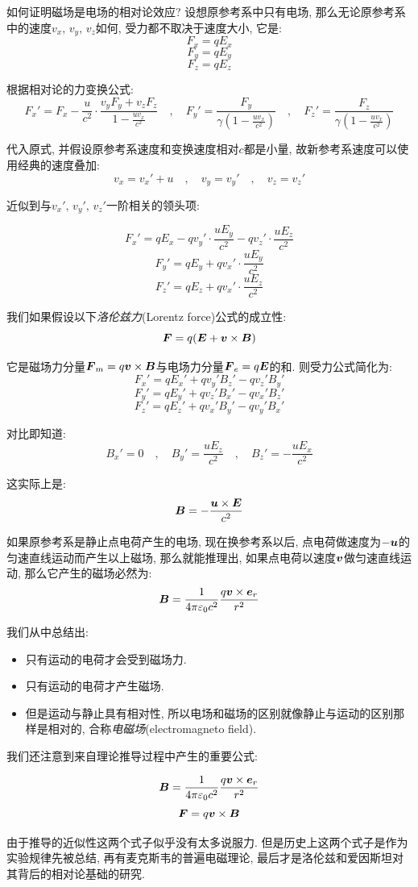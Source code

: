 如何证明磁场是电场的相对论效应? 设想原参考系中只有电场, 那么无论原参考系中的速度$v_x,\,v_y,\,v_z$如何, 受力都不取决于速度大小, 它是:
\[F_x=qE_x\]
\[ F_y=qE_y \]
\[  F_z=qE_z\]

根据相对论的力变换公式:
\[F_x'=F_x-\frac{u}{c^2}\cdot\frac{v_yF_y+v_zF_z}{1-\frac{uv_x}{c^2}}\quad ,\quad F_y'=\frac{F_y}{\gamma (1-\frac{uv_x}{c^2})}\quad ,\quad F_z'=\frac{F_z}{\gamma (1-\frac{uv_x}{c^2})}\]

代入原式, 并假设原参考系速度和变换速度相对$c$都是小量, 故新参考系速度可以使用经典的速度叠加:
\[v_x=v_x'+u\quad ,\quad v_y=v_y' \quad ,\quad v_z=v_z'\]

近似到与$v_x',\,v_y',\,v_z'$一阶相关的领头项:

\[F_x'=qE_x-qv_y'\cdot \frac{uE_y}{c^2}-qv_z'\cdot \frac{uE_z}{c^2}\]
\[F_y'=qE_y+qv_x'\cdot \frac{uE_y}{c^2}\]
\[F_z'=qE_z+qv_x'\cdot \frac{uE_z}{c^2}\]

我们如果假设以下\emph{洛伦兹力}(Lorentz force)公式的成立性:
\[\boldsymbol{F}=q(\boldsymbol{E}+\boldsymbol{v}\times \boldsymbol{B})\]

它是磁场力分量$\boldsymbol{F}_m=q\boldsymbol{v}\times \boldsymbol{B}$与电场力分量$\boldsymbol{F}_e=q\boldsymbol{E}$的和. 则受力公式简化为:
\[F_x'=qE_x'+qv_y'B_z'-qv_z'B_y'\]
\[F_y'=qE_y'+qv_z'B_x'-qv_x'B_z'\]
\[F_z'=qE_z'+qv_x'B_y'-qv_y'B_x'\]

对比即知道:
\[B_x'=0\quad ,\quad B_y'=\frac{uE_z}{c^2} \quad ,\quad B_z'=-\frac{uE_x}{c^2}\]

这实际上是:
\[\boldsymbol{B}=-\frac{\boldsymbol{u}\times \boldsymbol{E}}{c^2}\]

如果原参考系是静止点电荷产生的电场, 现在换参考系以后, 点电荷做速度为$-\boldsymbol{u}$的匀速直线运动而产生以上磁场, 那么就能推理出, 如果点电荷以速度$\boldsymbol{v}$做匀速直线运动, 那么它产生的磁场必然为:
\[\boldsymbol{B}=\frac{1}{4\pi \varepsilon_0 c^2}\frac{q\boldsymbol{v}\times \boldsymbol{e}_r}{r^2}\]

我们从中总结出:
\begin{itemize}
	\item 只有运动的电荷才会受到磁场力.
	\item 只有运动的电荷才产生磁场.
	\item 但是运动与静止具有相对性, 所以电场和磁场的区别就像静止与运动的区别那样是相对的, 合称\emph{电磁场}(electromagneto field).
\end{itemize}

我们还注意到来自理论推导过程中产生的重要公式:

\[\boldsymbol{B}=\frac{1}{4\pi \varepsilon_0 c^2}\frac{q\boldsymbol{v}\times \boldsymbol{e}_r}{r^2}\]
\[\boldsymbol{F}=q\boldsymbol{v}\times \boldsymbol{B}\]

由于推导的近似性这两个式子似乎没有太多说服力. 但是历史上这两个式子是作为实验规律先被总结, 再有麦克斯韦的普遍电磁理论, 最后才是洛伦兹和爱因斯坦对其背后的相对论基础的研究.


